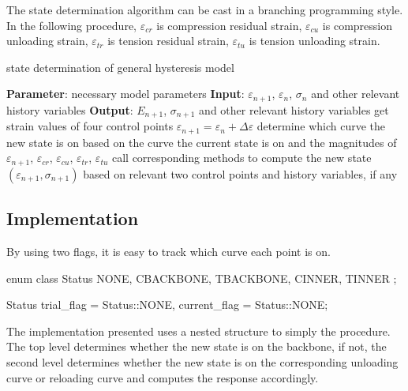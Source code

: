 The state determination algorithm can be cast in a branching programming style. In the following procedure, $\varepsilon_{cr}$ is compression residual strain, $\varepsilon_{cu}$ is compression unloading strain, $\varepsilon_{tr}$ is tension residual strain, $\varepsilon_{tu}$ is tension unloading strain.
\begin{breakablealgorithm}
\caption{state determination of general hysteresis model}\label{algo:gen_hys}
\begin{algorithmic}[1]
\State \textbf{Parameter}: necessary model parameters
\State \textbf{Input}: $\varepsilon_{n+1}$, $\varepsilon_n$, $\sigma_n$ and other relevant history variables
\State \textbf{Output}: $E_{n+1}$, $\sigma_{n+1}$ and other relevant history variables
\State get strain values of four control points
\State $\varepsilon_{n+1}=\varepsilon_n+\Delta\varepsilon$
\State determine which curve the new state is on based on the curve the current state is on and the magnitudes of $\varepsilon_{n+1}$, $\varepsilon_{cr}$, $\varepsilon_{cu}$, $\varepsilon_{tr}$,  $\varepsilon_{tu}$
\State call corresponding methods to compute the new state $(\varepsilon_{n+1},\sigma_{n+1})$ based on relevant two control points and history variables, if any
\end{algorithmic}
\end{breakablealgorithm}

\subsection{Implementation}
By using two flags, it is easy to track which curve each point is on.
\begin{cppcode}
	enum class Status { NONE, CBACKBONE, TBACKBONE, CINNER, TINNER };

	Status trial_flag = Status::NONE, current_flag = Status::NONE;
\end{cppcode}

The implementation presented uses a nested structure to simply the procedure. The top level determines whether the new state is on the backbone, if not, the second level determines whether the new state is on the corresponding unloading curve or reloading curve and computes the response accordingly.

